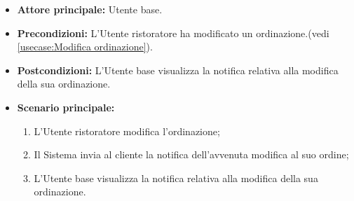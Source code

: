 \label{usecase:Visualizzazione notifica modifica ordinazione}
\begin{itemize}
	\item \textbf{Attore principale:} Utente base.

	\item \textbf{Precondizioni:} L'Utente ristoratore ha modificato un ordinazione.(vedi \autoref{usecase:Modifica ordinazione}).

	\item \textbf{Postcondizioni:} L'Utente base visualizza la notifica relativa alla modifica della sua ordinazione.

	\item \textbf{Scenario principale:}
	      \begin{enumerate}
		      \item L'Utente ristoratore modifica l'ordinazione;
		      \item Il Sistema invia al cliente la notifica dell'avvenuta modifica al suo ordine;
		      \item L'Utente base visualizza la notifica relativa alla modifica della sua ordinazione.
	      \end{enumerate}
\end{itemize}